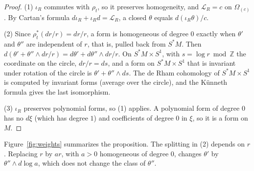 \documentclass[11pt,oneside,reqno]{article}
\newcommand{\Z}{\mathbb Z}
\newcommand{\Om}{\Omega}
\newcommand{\Lie}{\mathcal L}
\theoremstyle{plain}
\theoremstyle{definition}
\theoremstyle{remark}
\begin{document}
\begin{proof}
(1) \(\iota_R\) commutes with \(\rho_t\), so it preserves homogeneity, and
\(\Lie_R=c\) on \(\Om_{(c)}\). By Cartan's formula \(d\iota_R+\iota_Rd=\Lie_R\), a closed
\(\theta\) equals \(d(\iota_R\theta)/c\).

(2) Since \(\rho_t^*(dr/r)=dr/r\), a form is homogeneous of degree \(0\) exactly
when \(\theta'\) and \(\theta''\) are independent of \(r\), that is, pulled back from
\(S^*M\). Then \(d(\theta'+\theta''\wedge dr/r)=d\theta'+d\theta''\wedge dr/r\). On
\(S^*M\times S^1\), with \(s=\log r\bmod\Z\) the coordinate on the circle,
\(dr/r=ds\), and a form on \(S^*M\times S^1\) that is invariant under rotation of
the circle is \(\theta'+\theta''\wedge ds\). The de Rham cohomology of
\(S^*M\times S^1\) is computed by invariant forms (average over the circle), and
the Künneth formula gives the last isomorphism.

(3) \(\iota_R\) preserves polynomial forms, so (1) applies. A polynomial form
of degree \(0\) has no \(d\xi\) (which has degree \(1\)) and coefficients of degree
\(0\) in \(\xi\), so it is a form on \(M\).
\end{proof}

Figure~\ref{fig:weights} summarizes the proposition. The splitting in (2) depends on \(r\). Replacing \(r\) by \(ar\), with \(a>0\)
homogeneous of degree \(0\), changes \(\theta'\) by \(\theta''\wedge d\log a\), which does not
change the class of \(\theta''\).
\end{document}
